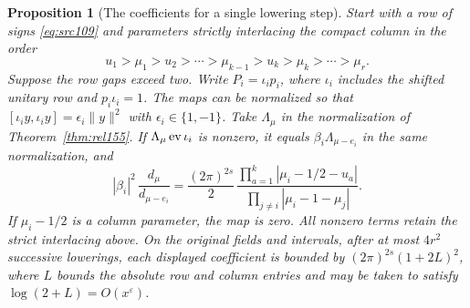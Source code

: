 \documentclass[a4paper,11pt]{article}
\newtheorem{proposition}{Proposition}[section]
\theoremstyle{definition}
\theoremstyle{remark}
\numberwithin{equation}{section}
\begin{document}
\begin{proposition}[The coefficients for a single lowering step]\leavevmode
\label{prop:transfer286}
Start with a row of signs \eqref{eq:src109} and parameters
strictly interlacing the compact column in the order
\[
 u_1>\mu_1>u_2>\cdots>\mu_{k-1}>u_k>\mu_k>\cdots>\mu_r .
\]
Suppose the row gaps exceed two. Write
\(P_i=\iota_i p_i\), where \(\iota_i\) includes the shifted
unitary row and \(p_i\iota_i=1\). The maps can be normalized
so that \([\iota_i y,\iota_i y]=\epsilon_i\|y\|^2\) with
\(\epsilon_i\in\{1,-1\}\). Take \(\Lambda_\mu\) in the
normalization of Theorem~\ref{thm:rel155}. If
\(\Lambda_\mu\,{\rm ev}\,\iota_i\) is nonzero, it equals
\(\beta_i\Lambda_{\mu-e_i}\) in the same normalization, and
\[
 |\beta_i|^2\,\frac{d_\mu}{d_{\mu-e_i}}
 =\frac{(2\pi)^{2s}}{2}\,
 \frac{\prod_{a=1}^k|\mu_i-1/2-u_a|}
      {\prod_{j\ne i}|\mu_i-1-\mu_j|}.
\]
If \(\mu_i-1/2\) is a column parameter, the map is zero.
All nonzero terms retain the strict interlacing above. On the
original fields and intervals, after at most \(4r^2\)
successive lowerings, each displayed coefficient is bounded by
\((2\pi)^{2s}(1+2L)^2\), where \(L\) bounds the absolute row
and column entries and may be taken to satisfy \(\log(2+L)=
O(x^\varepsilon)\).
\end{proposition}
\end{document}
